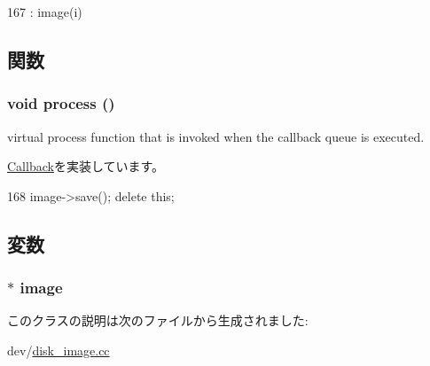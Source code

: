 \begin{DoxyCode}
167 : image(i) {}
\end{DoxyCode}


\subsection{関数}
\hypertarget{classCowDiskCallback_a2e9c5136d19b1a95fc427e0852deab5c}{
\subsubsection[{process}]{\setlength{\rightskip}{0pt plus 5cm}void process ()}}
\label{classCowDiskCallback_a2e9c5136d19b1a95fc427e0852deab5c}
virtual process function that is invoked when the callback queue is executed. 

\hyperlink{classCallback_a142b75b68a6291400e20fb0dd905b1c8}{Callback}を実装しています。


\begin{DoxyCode}
168 { image->save(); delete this; }
\end{DoxyCode}


\subsection{変数}
\hypertarget{classCowDiskCallback_a1d52b13d96a394b1f96e76708456ee27}{
\subsubsection[{image}]{$\ast$ {\bf image}}}
\label{classCowDiskCallback_a1d52b13d96a394b1f96e76708456ee27}


このクラスの説明は次のファイルから生成されました:\begin{DoxyCompactItemize}
\item 
dev/\hyperlink{disk__image_8cc}{disk\_\-image.cc}\end{DoxyCompactItemize}
